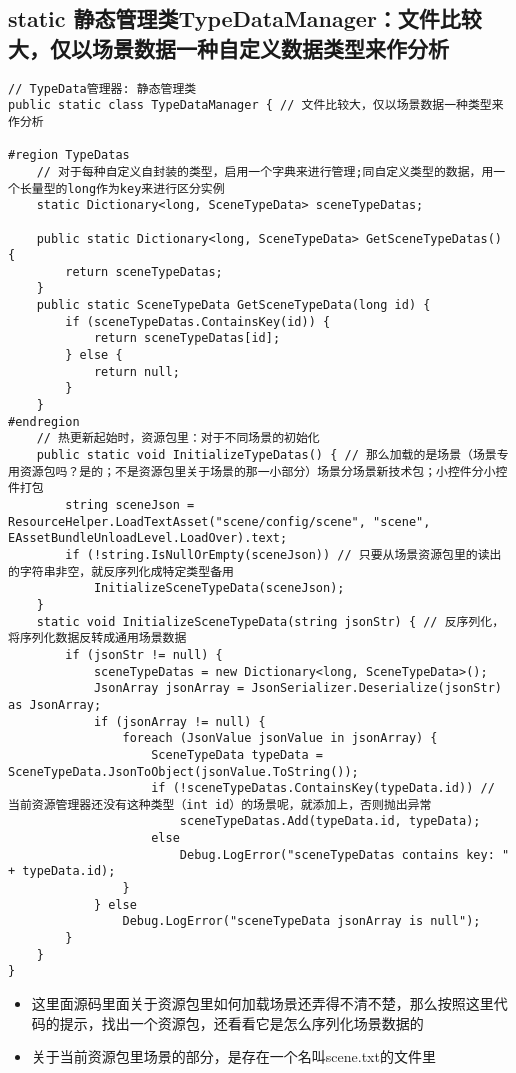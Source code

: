 \documentclass[9pt, b5paper]{article}
\begin{document}
\subsection{static 静态管理类TypeDataManager：文件比较大，仅以场景数据一种自定义数据类型来作分析}
\label{sec-2-3}
\begin{verbatim}
// TypeData管理器: 静态管理类
public static class TypeDataManager { // 文件比较大，仅以场景数据一种类型来作分析

#region TypeDatas
    // 对于每种自定义自封装的类型，启用一个字典来进行管理;同自定义类型的数据，用一个长量型的long作为key来进行区分实例
    static Dictionary<long, SceneTypeData> sceneTypeDatas;

    public static Dictionary<long, SceneTypeData> GetSceneTypeDatas() {
        return sceneTypeDatas;
    }
    public static SceneTypeData GetSceneTypeData(long id) {
        if (sceneTypeDatas.ContainsKey(id)) {
            return sceneTypeDatas[id];
        } else {
            return null;
        }
    }
#endregion
    // 热更新起始时，资源包里：对于不同场景的初始化
    public static void InitializeTypeDatas() { // 那么加载的是场景（场景专用资源包吗？是的；不是资源包里关于场景的那一小部分）场景分场景新技术包；小控件分小控件打包
        string sceneJson = ResourceHelper.LoadTextAsset("scene/config/scene", "scene", EAssetBundleUnloadLevel.LoadOver).text;
        if (!string.IsNullOrEmpty(sceneJson)) // 只要从场景资源包里的读出的字符串非空，就反序列化成特定类型备用
            InitializeSceneTypeData(sceneJson);
    }
    static void InitializeSceneTypeData(string jsonStr) { // 反序列化，将序列化数据反转成通用场景数据
        if (jsonStr != null) {
            sceneTypeDatas = new Dictionary<long, SceneTypeData>();
            JsonArray jsonArray = JsonSerializer.Deserialize(jsonStr) as JsonArray;
            if (jsonArray != null) {
                foreach (JsonValue jsonValue in jsonArray) {
                    SceneTypeData typeData = SceneTypeData.JsonToObject(jsonValue.ToString());
                    if (!sceneTypeDatas.ContainsKey(typeData.id)) // 当前资源管理器还没有这种类型（int id）的场景呢，就添加上，否则抛出异常
                        sceneTypeDatas.Add(typeData.id, typeData);
                    else 
                        Debug.LogError("sceneTypeDatas contains key: " + typeData.id);
                }
            } else 
                Debug.LogError("sceneTypeData jsonArray is null");
        }
    }
}
\end{verbatim}
\begin{itemize}
\item 这里面源码里面关于资源包里如何加载场景还弄得不清不楚，那么按照这里代码的提示，找出一个资源包，还看看它是怎么序列化场景数据的
\item 关于当前资源包里场景的部分，是存在一个名叫scene.txt的文件里
\end{itemize}
\end{document}

